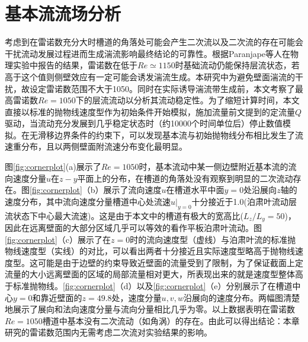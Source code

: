 \section{基本流流场分析}
考虑到在雷诺数充分大时槽道的角落处可能会产生二次流以及二次流的存在可能会干扰流动发展过程进而生成湍流影响最终结论的可靠性。根据Paranjape等人在物理实验中报告的结果\cite{Paranjape2019}，雷诺数在低于$Re\simeq 1150$时基础流动仍能保持层流状态，若高于这个值则侧壁效应有一定可能会诱发湍流生成。本研究中为避免壁面湍流的干扰，故设定雷诺数范围不大于1050。同时在实际诱导湍流带生成前，本文考察了最高雷诺数$Re = 1050$下的层流流动以分析其流动稳定性。为了缩短计算时间，本文直接以标准的抛物线速度型作为初始条件开始模拟，施加流量前文提到的定流量$Q$驱动，当流动充分发展到几乎稳定状态时（约10000个时间单位后）停止数值模拟。在无滑移边界条件的约束下，可以发现基本流与初始抛物线分布相比发生了流速重分布，且以两侧壁面附流速分布变化最明显。

图\ref{fig:cornerplot}(a)展示了$Re = 1050$时，基本流动中某一侧边壁附近基本流的流向速度分量$u$在$z-y$平面上的分布，在槽道的角落处没有观察到明显的二次流动存在。图\ref{fig:cornerplot}（b）展示了流向速度$u$在槽道水平中面$y = 0$处沿展向$z$轴的速度分布，其中流向速度分量槽道中心处流速$u|_{y = 0}$十分接近于1.0(泊肃叶流动层流状态下中心最大流速)。这是由于本文中的槽道有极大的宽高比($L_z/L_y=50$)，因此在远离壁面的大部分区域几乎可以等效的看作平板泊肃叶流动。图\ref{fig:cornerplot}（c）展示了在$z = 0$时的流向速度型（虚线）与泊肃叶流的标准抛物线速度型（实线）的对比，可以看出两者十分接近且实际速度型略高于抛物线速度型。这可能是由于边壁的约束导致近壁面的流量受到了限制，为了保证截面上定流量的大小远离壁面的区域的局部流量相对更大，所表现出来的就是速度型整体高于标准抛物线。\ref{fig:cornerplot}（d）以及\ref{fig:cornerplot}（e）分别展示了在槽道中心$y = 0$和靠近壁面的$z = 49.8$处，速度分量$u,v,w$沿展向的速度分布。两幅图清楚地展示了展向和法向速度分量与流向分量相比几乎为零。以上数据表明在雷诺数$Re = 1050$槽道中基本没有二次流动（如角涡）的存在。由此可以得出结论：本章研究的雷诺数范围内无需考虑二次流对实验结果的影响。


